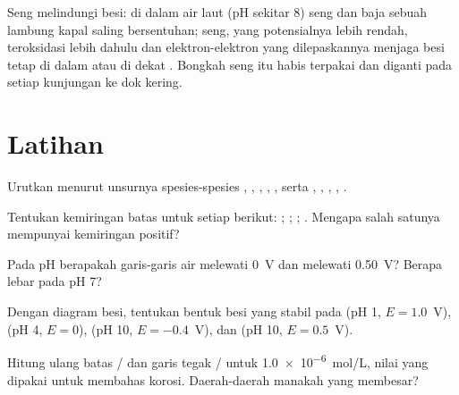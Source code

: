 Seng melindungi besi: di dalam air laut (pH sekitar 8) seng dan baja
sebuah lambung kapal saling bersentuhan; seng, yang potensialnya lebih
rendah, teroksidasi lebih dahulu dan elektron-elektron yang dilepaskannya
menjaga besi tetap di dalam atau di dekat . Bongkah
seng itu habis terpakai dan diganti pada setiap kunjungan ke dok kering.

\section{Latihan}

\begin{exercise}[$\star$]\label{exo:b1:e-ph-diagrams:1}
Urutkan menurut  unsurnya spesies-spesies ,
, , , , serta , ,
, , .
\end{exercise}

\begin{exercise}[$\star$]\label{exo:b1:e-ph-diagrams:2}
Tentukan kemiringan batas untuk setiap  berikut:
; ;
; .
Mengapa salah satunya mempunyai kemiringan positif?
\end{exercise}

\begin{exercise}[$\star$]\label{exo:b1:e-ph-diagrams:3}
Pada pH berapakah garis-garis air melewati 0~V dan melewati
\qty{0.50}{V}? Berapa lebar  pada pH 7?
\end{exercise}

\begin{exercise}[$\star$]\label{exo:b1:e-ph-diagrams:4}
Dengan diagram besi, tentukan bentuk besi yang stabil pada
(pH 1, $E = 1.0$~V), (pH 4, $E = 0$), (pH 10, $E = -0.4$~V), dan
(pH 10, $E = 0.5$~V).
\end{exercise}

\begin{exercise}[$\star\star$]\label{exo:b1:e-ph-diagrams:5}
Hitung ulang batas / dan garis tegak
/ untuk  \qty{1.0e-6}{mol/L},
nilai yang dipakai untuk membahas korosi. Daerah-daerah manakah yang
membesar?
\end{exercise}

